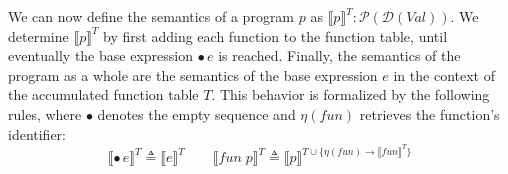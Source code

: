 We can now define the semantics of a \NDICE program $p$ as $\llbracket p \rrbracket^T \colon  \mathcal{P}(\mathcal{D}(\mathit{Val}))$.
We determine $\llbracket p \rrbracket^T$ by first adding each function to the function table, until eventually the base expression $\bullet \, e$ is reached.
Finally, the semantics of the program as a whole are the semantics of the base expression $e$ in the context of the accumulated function table $T$.
This behavior is formalized by the following rules, where $\bullet$ denotes the empty sequence and $\eta(fun)$ retrieves the function's identifier:
$$ \llbracket \bullet \, e \rrbracket^T \triangleq \llbracket e \rrbracket^T \qquad \llbracket fun \; p \rrbracket^T \triangleq \llbracket p \rrbracket^{T \cup \{\eta(fun) \rightarrow \llbracket fun \rrbracket^T\}} $$

